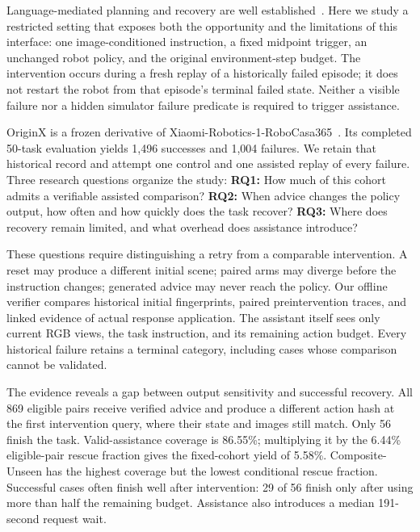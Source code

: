 \documentclass[10pt,twocolumn,letterpaper]{article}
\begin{document}
Language-mediated planning and recovery are well established~\cite{saycan,innermonologue,reflect,racer,flare}. Here we study a restricted setting that exposes both the opportunity and the limitations of this interface: one image-conditioned instruction, a fixed midpoint trigger, an unchanged robot policy, and the original environment-step budget. The intervention occurs during a fresh replay of a historically failed episode; it does not restart the robot from that episode's terminal failed state. Neither a visible failure nor a hidden simulator failure predicate is required to trigger assistance.

OriginX is a frozen derivative of Xiaomi-Robotics-1-RoboCasa365~\cite{xiaomi}. Its completed 50-task evaluation yields 1,496 successes and 1,004 failures. We retain that historical record and attempt one control and one assisted replay of every failure. Three research questions organize the study: \textbf{RQ1:} How much of this cohort admits a verifiable assisted comparison? \textbf{RQ2:} When advice changes the policy output, how often and how quickly does the task recover? \textbf{RQ3:} Where does recovery remain limited, and what overhead does assistance introduce?

These questions require distinguishing a retry from a comparable intervention. A reset may produce a different initial scene; paired arms may diverge before the instruction changes; generated advice may never reach the policy. Our offline verifier compares historical initial fingerprints, paired preintervention traces, and linked evidence of actual response application. The assistant itself sees only current RGB views, the task instruction, and its remaining action budget. Every historical failure retains a terminal category, including cases whose comparison cannot be validated.

The evidence reveals a gap between output sensitivity and successful recovery. All 869 eligible pairs receive verified advice and produce a different action hash at the first intervention query, where their state and images still match. Only 56 finish the task. Valid-assistance coverage is 86.55\%; multiplying it by the 6.44\% eligible-pair rescue fraction gives the fixed-cohort yield of 5.58\%. Composite-Unseen has the highest coverage but the lowest conditional rescue fraction. Successful cases often finish well after intervention: 29 of 56 finish only after using more than half the remaining budget. Assistance also introduces a median 191-second request wait.
\end{document}
